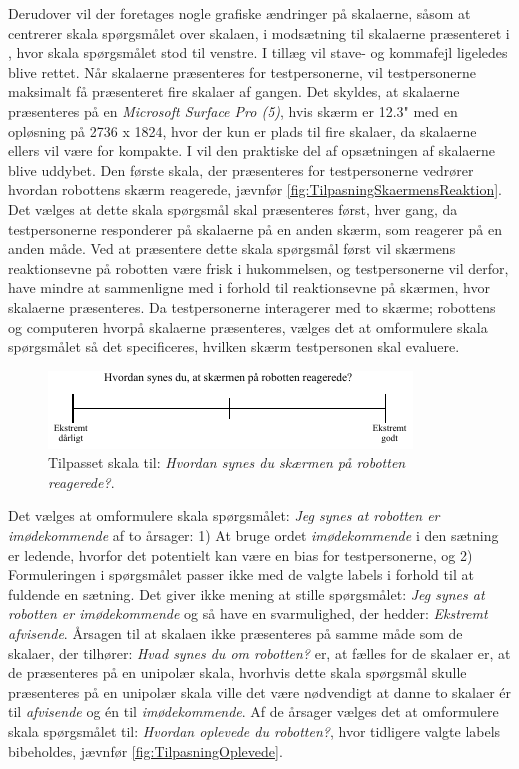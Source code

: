 Derudover vil der foretages nogle grafiske ændringer på skalaerne, såsom at centrerer skala spørgsmålet over skalaen, i modsætning til skalaerne præsenteret i , hvor skala spørgsmålet stod til venstre. I tillæg vil stave- og kommafejl ligeledes blive rettet. Når skalaerne præsenteres for testpersonerne, vil testpersonerne maksimalt få præsenteret fire skalaer af gangen. Det skyldes, at skalaerne præsenteres på en \textit{Microsoft Surface Pro (5)}, hvis skærm er 12.3" med en opløsning på 2736 x 1824, hvor der kun er plads til fire skalaer, da skalaerne ellers vil være for kompakte. I  vil den praktiske del af opsætningen af skalaerne blive uddybet. \blankline 
%
Den første skala, der præsenteres for testpersonerne vedrører hvordan robottens skærm reagerede, jævnfør \autoref{fig:TilpasningSkaermensReaktion}. Det vælges at dette skala spørgsmål skal præsenteres først, hver gang, da testpersonerne responderer på skalaerne på en anden skærm, som reagerer på en anden måde. Ved at præsentere dette skala spørgsmål først vil skærmens reaktionsevne på robotten være frisk i hukommelsen, og testpersonerne vil derfor, have mindre at sammenligne med i forhold til reaktionsevne på skærmen, hvor skalaerne præsenteres. Da testpersonerne interagerer med to skærme; robottens og computeren hvorpå skalaerne præsenteres, vælges det at omformulere skala spørgsmålet så det specificeres, hvilken skærm testpersonen skal evaluere.  
%
%
\begin{figure}[H]
\centering
\includegraphics[width =\textwidth]{Figure/TilpasningAfSkalaer/TilpassetSkaermensReaktion} 
\caption{Tilpasset skala til: \textit{Hvordan synes du skærmen på robotten reagerede?}.}
\label{fig:TilpasningSkaermensReaktion}
\end{figure}
\noindent
%
Det vælges at omformulere skala spørgsmålet: \textit{Jeg synes at robotten er imødekommende} af to årsager: 1) At bruge ordet \textit{imødekommende} i den sætning er ledende, hvorfor det potentielt kan være en bias for testpersonerne, og 2) Formuleringen i spørgsmålet passer ikke med de valgte labels i forhold til at fuldende en sætning. Det giver ikke mening at stille spørgsmålet: \textit{Jeg synes at robotten er imødekommende} og så have en svarmulighed, der hedder: \textit{Ekstremt afvisende}. Årsagen til at skalaen ikke præsenteres på samme måde som de skalaer, der tilhører: \textit{Hvad synes du om robotten?} er, at fælles for de skalaer er, at de præsenteres på en unipolær skala, hvorhvis dette skala spørgsmål skulle præsenteres på en unipolær skala ville det være nødvendigt at danne to skalaer ér til \textit{afvisende} og én til \textit{imødekommende}. Af de årsager vælges det at omformulere skala spørgsmålet til: \textit{Hvordan oplevede du robotten?}, hvor tidligere valgte labels bibeholdes, jævnfør \autoref{fig:TilpasningOplevede}.
